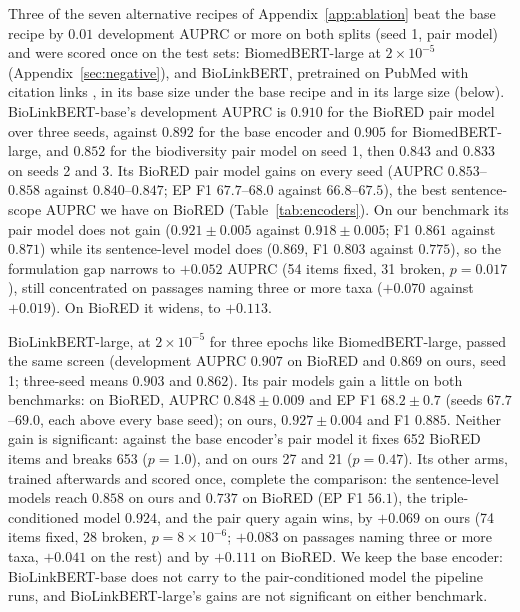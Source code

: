 \documentclass[11pt]{article}
\begin{document}
Three of the seven alternative recipes of Appendix~\ref{app:ablation} beat the base recipe by $0.01$
development AUPRC or more on both splits (seed 1, pair model) and were scored once on the test sets:
BiomedBERT-large at $2\times10^{-5}$ (Appendix~\ref{sec:negative}), and BioLinkBERT, pretrained on
PubMed with citation links \citep{yasunaga2022linkbert}, in its base size under the base recipe and
in its large size (below). BioLinkBERT-base's development AUPRC is $0.910$ for the BioRED pair model
over three seeds, against $0.892$ for the base encoder and $0.905$ for BiomedBERT-large, and $0.852$
for the biodiversity pair model on seed 1, then $0.843$ and $0.833$ on seeds 2 and 3. Its BioRED
pair model gains on every seed (AUPRC $0.853$--$0.858$ against $0.840$--$0.847$; EP F1
$67.7$--$68.0$ against $66.8$--$67.5$), the best sentence-scope AUPRC we have on BioRED
(Table~\ref{tab:encoders}). On our benchmark its pair model does not gain ($0.921 \pm
0.005$ against $0.918 \pm 0.005$; F1 $0.861$ against $0.871$) while its sentence-level model does
($0.869$, F1 $0.803$ against $0.775$), so the formulation gap narrows to $+0.052$ AUPRC (54 items
fixed, 31 broken, $p = 0.017$), still concentrated on passages naming three or more taxa ($+0.070$
against $+0.019$). On BioRED it widens, to $+0.113$.

BioLinkBERT-large, at $2\times10^{-5}$ for three epochs like BiomedBERT-large, passed the same screen
(development AUPRC $0.907$ on BioRED and $0.869$ on ours, seed 1; three-seed means $0.903$ and
$0.862$). Its pair models gain a little on both benchmarks: on BioRED, AUPRC $0.848 \pm 0.009$ and EP
F1 $68.2 \pm 0.7$ (seeds $67.7$--$69.0$, each above every base seed); on ours, $0.927 \pm 0.004$ and
F1 $0.885$. Neither gain is significant: against the base encoder's pair model it fixes 652 BioRED
items and breaks 653 ($p = 1.0$), and on ours 27 and 21 ($p = 0.47$). Its other arms, trained
afterwards and scored once, complete the comparison: the sentence-level models reach $0.858$ on ours
and $0.737$ on BioRED (EP F1 $56.1$), the triple-conditioned model $0.924$, and the
pair query again wins, by $+0.069$ on ours (74 items fixed, 28 broken,
$p = 8\times10^{-6}$; $+0.083$ on passages naming three or more taxa, $+0.041$ on the rest) and by
$+0.111$ on BioRED. We keep the base encoder: BioLinkBERT-base does not carry to the pair-conditioned model the pipeline runs, and
BioLinkBERT-large's gains are not significant on either benchmark.
\end{document}

